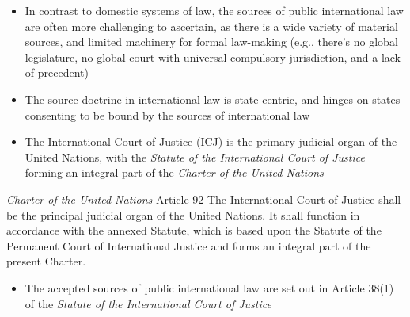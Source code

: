 \begin{itemize}
    \item In contrast to domestic systems of law, the sources of public international law are often more challenging to ascertain, as there is a wide variety of material sources, and limited machinery for formal law-making (e.g., there's no global legislature, no global court with universal compulsory jurisdiction, and a lack of precedent)
    \item The source doctrine in international law is state-centric, and hinges on states consenting to be bound by the sources of international law
    \item The International Court of Justice (ICJ) is the primary judicial organ of the United Nations, with the \textit{Statute of the International Court of Justice} forming an integral part of the \textit{Charter of the United Nations}
\end{itemize}

\begin{conventiondetails}{\textit{Charter of the United Nations} Article 92}
    \flushleft
    The International Court of Justice shall be the principal judicial organ of the United Nations. It shall function in accordance with the annexed Statute, which is based upon the Statute of the Permanent Court of International Justice and forms an integral part of the present Charter.
\end{conventiondetails}

\begin{itemize}
    \item The accepted sources of public international law are set out in Article 38(1) of the \textit{Statute of the International Court of Justice}
\end{itemize}

